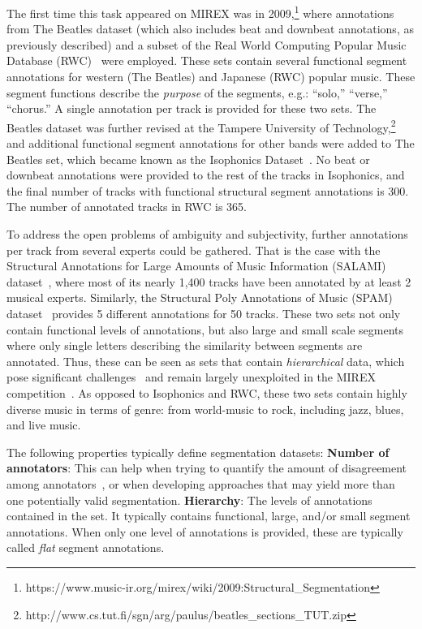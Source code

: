 \documentclass{article}
\begin{document}
The first time this task appeared on MIREX was in 2009,\footnote{https://www.music-ir.org/mirex/wiki/2009:Structural\_Segmentation} where annotations from The Beatles dataset (which also includes beat and downbeat annotations, as previously described) and a subset of the Real World Computing Popular Music Database (RWC)~\cite{Goto2002} were employed.
These sets contain several functional segment annotations for western (The Beatles) and Japanese (RWC) popular music.
These segment functions describe the \emph{purpose} of the segments, e.g.: ``solo,'' ``verse,'' ``chorus.''
A single annotation per track is provided for these two sets.
The Beatles dataset was further revised at the Tampere University of Technology,\footnote{http://www.cs.tut.fi/sgn/arg/paulus/beatles\_sections\_TUT.zip} and additional functional segment annotations for other bands were added to The Beatles set, which became known as the Isophonics Dataset~\cite{Mauch2009a}.
No beat or downbeat annotations were provided to the rest of the tracks in Isophonics, and the final number of tracks with functional structural segment annotations is 300.
The number of annotated tracks in RWC is 365.

To address the open problems of ambiguity and subjectivity, further annotations per track from several experts could be gathered.
That is the case with the Structural Annotations for Large Amounts of Music Information (SALAMI) dataset~\cite{Smith2011}, where most of its nearly 1,400 tracks have been annotated by at least 2 musical experts.
Similarly, the Structural Poly Annotations of Music (SPAM) dataset~\cite{Nieto2016} provides 5 different annotations for 50 tracks.
These two sets not only contain functional levels of annotations, but also large and small scale segments where only single letters describing the similarity between segments are annotated.
Thus, these can be seen as sets that contain \emph{hierarchical} data, which pose significant challenges~\cite{McFee2017} and remain largely unexploited in the MIREX competition~\cite{Ehmann2011, Smith2013}.
As opposed to Isophonics and RWC, these two sets contain highly diverse music in terms of genre: from world-music to rock, including jazz, blues, and live music.

The following properties typically define segmentation datasets:
\textbf{Number of annotators}: This can help when trying to quantify the amount of disagreement among annotators~\cite{McFee2017,Nieto2016}, or when developing approaches that may yield more than one potentially valid segmentation.
\textbf{Hierarchy}: The levels of annotations contained in the set. It typically contains functional, large, and/or small segment annotations.
When only one level of annotations is provided, these are typically called \emph{flat} segment annotations.
\end{document}
